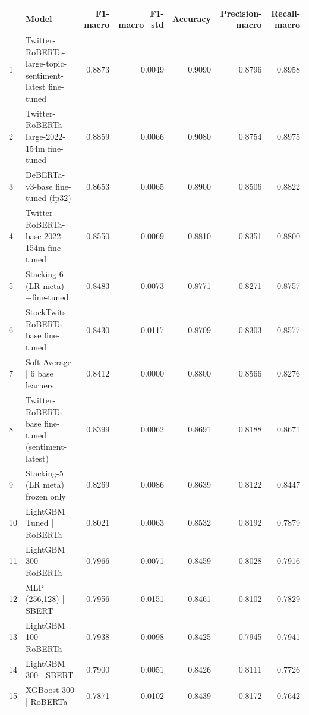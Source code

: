 \begin{tabular}{llrrrrr}
\toprule
 & Model & F1-macro & F1-macro_std & Accuracy & Precision-macro & Recall-macro \\
\midrule
1 & Twitter-RoBERTa-large-topic-sentiment-latest fine-tuned & 0.8873 & 0.0049 & 0.9090 & 0.8796 & 0.8958 \\
2 & Twitter-RoBERTa-large-2022-154m fine-tuned & 0.8859 & 0.0066 & 0.9080 & 0.8754 & 0.8975 \\
3 & DeBERTa-v3-base fine-tuned (fp32) & 0.8653 & 0.0065 & 0.8900 & 0.8506 & 0.8822 \\
4 & Twitter-RoBERTa-base-2022-154m fine-tuned & 0.8550 & 0.0069 & 0.8810 & 0.8351 & 0.8800 \\
5 & Stacking-6 (LR meta) | +fine-tuned & 0.8483 & 0.0073 & 0.8771 & 0.8271 & 0.8757 \\
6 & StockTwits-RoBERTa-base fine-tuned & 0.8430 & 0.0117 & 0.8709 & 0.8303 & 0.8577 \\
7 & Soft-Average | 6 base learners & 0.8412 & 0.0000 & 0.8800 & 0.8566 & 0.8276 \\
8 & Twitter-RoBERTa-base fine-tuned (sentiment-latest) & 0.8399 & 0.0062 & 0.8691 & 0.8188 & 0.8671 \\
9 & Stacking-5 (LR meta) | frozen only & 0.8269 & 0.0086 & 0.8639 & 0.8122 & 0.8447 \\
10 & LightGBM Tuned | RoBERTa & 0.8021 & 0.0063 & 0.8532 & 0.8192 & 0.7879 \\
11 & LightGBM 300 | RoBERTa & 0.7966 & 0.0071 & 0.8459 & 0.8028 & 0.7916 \\
12 & MLP (256,128) | SBERT & 0.7956 & 0.0151 & 0.8461 & 0.8102 & 0.7829 \\
13 & LightGBM 100 | RoBERTa & 0.7938 & 0.0098 & 0.8425 & 0.7945 & 0.7941 \\
14 & LightGBM 300 | SBERT & 0.7900 & 0.0051 & 0.8426 & 0.8111 & 0.7726 \\
15 & XGBoost 300 | RoBERTa & 0.7871 & 0.0102 & 0.8439 & 0.8172 & 0.7642 \\
\bottomrule
\end{tabular}
